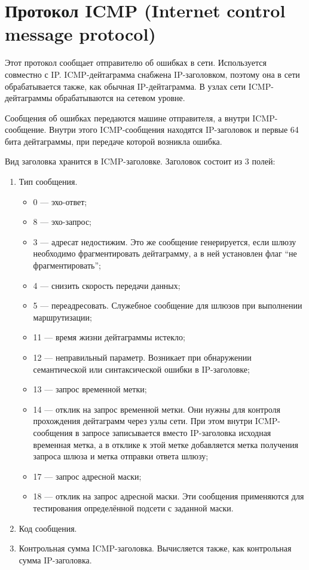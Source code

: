 \documentclass[12pt, russian, oneside, article]{ncc}
\begin{document}
\section{Протокол ICMP (Internet control message protocol)}
\label{sec-2}

Этот протокол сообщает отправителю об ошибках в сети. Используется совместно с IP. ICMP-дейтаграмма снабжена IP-заголовком, поэтому она в сети обрабатывается также, как обычная IP-дейтаграмма. В узлах сети ICMP-дейтаграммы обрабатываются на сетевом уровне.

Сообщения об ошибках передаются машине отправителя, а внутри ICMP-сообщение. Внутри этого ICMP-сообщения находятся IP-заголовок и первые 64 бита дейтаграммы, при передаче которой возникла ошибка.

Вид заголовка хранится в ICMP-заголовке. Заголовок состоит из 3 полей:
\begin{enumerate}
\item Тип сообщения.

\begin{itemize}
\item 0 --- эхо-ответ;
\item 8 --- эхо-запрос;
\item 3 --- адресат недостижим. Это же сообщение генерируется, если шлюзу необходимо фрагментировать дейтаграмму, а в ней установлен флаг ``не фрагментировать'';
\item 4 --- снизить скорость передачи данных;
\item 5 --- переадресовать. Служебное сообщение для шлюзов при выполнении маршрутизации;
\item 11 --- время жизни дейтаграммы истекло;
\item 12 --- неправильный параметр. Возникает при обнаружении семантической или синтаксической ошибки в IP-заголовке;
\item 13 --- запрос временной метки;
\item 14 --- отклик на запрос временной метки. Они нужны для контроля прохождения дейтаграмм через узлы сети. При этом внутри ICMP-сообщения в запросе записывается вместо IP-заголовка исходная временная метка, а в отклике к этой метке добавляется метка получения запроса шлюза и метка отправки ответа шлюзу;
\item 17 --- запрос адресной маски;
\item 18 --- отклик на запрос адресной маски. Эти сообщения применяются для тестирования определённой подсети с заданной маски.
\end{itemize}

\item Код сообщения.
\item Контрольная сумма ICMP-заголовка. Вычисляется также, как контрольная сумма IP-заголовка.
\end{enumerate}
\end{document}
